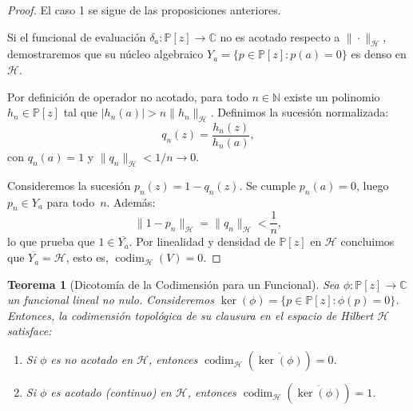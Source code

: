 \documentclass[12pt,a4paper]{article}
\newtheorem{theorem}{Teorema}
\theoremstyle{definition}
\theoremstyle{remark}
\newcommand{\C}{\mathbb{C}}
\newcommand{\Poly}{\mathbb{P}[z]}
\begin{document}
\begin{proof}
	El caso 1 se sigue de las proposiciones anteriores.

	Si el funcional de evaluación $\delta_a: \Poly \to \C$ no es acotado respecto a $\|\cdot\|_{\mathcal{H}}$, demostraremos que su núcleo algebraico $Y_a = \{p \in \Poly : p(a)=0\}$ es denso en $\mathcal{H}$.

	Por definición de operador no acotado, para todo $n \in \mathbb{N}$ existe un polinomio $h_n \in \Poly$ tal que $|h_n(a)| > n \|h_n\|_{\mathcal{H}}$. Definimos la sucesión normalizada:
	$$ q_n(z) = \frac{h_n(z)}{h_n(a)}, $$
	con $q_n(a) = 1$ y $\|q_n\|_{\mathcal{H}} < 1/n \to 0$.

	Consideremos la sucesión $p_n(z) = 1 - q_n(z)$. Se cumple $p_n(a) = 0$, luego $p_n \in Y_a$ para todo~$n$. Además:
	$$ \|1 - p_n\|_{\mathcal{H}} = \|q_n\|_{\mathcal{H}} < \frac{1}{n}, $$
	lo que prueba que $1 \in \overline{Y_a}$. Por linealidad y densidad de $\Poly$ en $\mathcal{H}$ concluimos que $\overline{Y_a} = \mathcal{H}$, esto es, $\operatorname{codim}_{\mathcal{H}}(V) = 0$.
\end{proof}

\begin{theorem}[Dicotomía de la Codimensión para un Funcional]\label{thm:dicotomia_1}
	Sea $\phi : \mathbb{P}[z] \to \mathbb{C}$ un funcional lineal no nulo. Consideremos $\ker(\phi) = \{ p \in \mathbb{P}[z] : \phi(p) = 0 \}$. Entonces, la codimensión topológica de su clausura en el espacio de Hilbert $\mathcal{H}$ satisface:
	\begin{enumerate}
		\item Si $\phi$ es no acotado en $\mathcal{H}$, entonces $\operatorname{codim}_\mathcal{H}(\overline{\ker(\phi)}) = 0$.
		\item Si $\phi$ es acotado (continuo) en $\mathcal{H}$, entonces $\operatorname{codim}_\mathcal{H}(\overline{\ker(\phi)}) = 1$.
	\end{enumerate}
\end{theorem}
\end{document}
